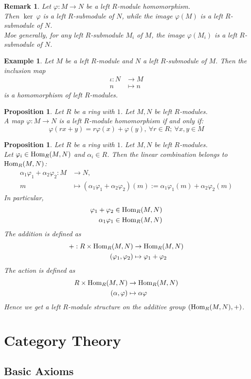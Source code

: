 \documentclass[a4paper,8pt]{article}
\newcommand{\hlt}[1]{\textit{{\color{blue}#1}}}
\newcommand{\homs}[1]{\textnormal{Hom}#1}
\theoremstyle{theorem}
\newtheorem{proposition}[theorem]{Proposition}
\newtheorem{example}[theorem]{Example}
\newtheorem{remark}[theorem]{Remark}
\begin{document}
\begin{remark}
Let $\varphi: M \rightarrow N$ be a left $R$-module homomorphism.\\
Then $\ker \ \varphi$ is a left $R$-submodule of $N$, while the image $\varphi(M)$ is a left $R$-submodule of $N$.\\
Moe generally, for any left $R$-submodule $M_i$ of $M$, the image $\varphi(M_i)$ is a left $R$-submodule of $N$.
\end{remark}

\begin{example}
Let $M$ be a left $R$-module and $N$ a left $R$-submodule of $M$. Then the inclusion map
\begin{align}
\iota: N &\rightarrow M \nonumber \\
n &\mapsto n \nonumber
\end{align}
is a homomorphism of left $R$-modules.
\end{example}

\begin{proposition}
Let $R$ be a ring with $1$. Let $M, N$ be left $R$-modules.\\
A map $\varphi: M \rightarrow N$ is a left $R$-module homomorphism if and only if:
\begin{equation}
\varphi(rx+y) = r\varphi(x) + \varphi(y), \ \forall r \in R; \ \forall x, y \in M \nonumber
\end{equation}
\end{proposition}

\begin{proposition}
Let $R$ be a ring with $1$. Let $M, N$ be left $R$-modules.\\
Let $\varphi_i \in \homs_R(M,N)$ and $\alpha_i \in R$. Then the \hlt{linear combination} belongs to $\homs_R(M,N)$:
\begin{align}
\alpha_1 \varphi_1 + \alpha_2 \varphi_2: M &\rightarrow N, \nonumber \\
m &\mapsto (\alpha_1 \varphi_1 + \alpha_2 \varphi_2)(m) := \alpha_1 \varphi_1(m) + \alpha_2 \varphi_2(m) \nonumber
\end{align}
In particular, 
\begin{align}
\varphi_1 + \varphi_2 &\in \homs_R(M,N) \nonumber \\
\alpha_1 \varphi_1 &\in \homs_R(M,N) \nonumber
\end{align}
The addition is defined as
\begin{align}
+ : R \times \homs_R(M,N) &\rightarrow \homs_R(M,N) \nonumber \\
(\varphi_1, \varphi_2) &\mapsto \varphi_1 + \varphi_2 \nonumber
\end{align}
The action is defined as
\begin{align}
R \times \homs_R(M,N) &\rightarrow \homs_R(M,N) \nonumber \\
(\alpha, \varphi) &\mapsto \alpha \varphi \nonumber
\end{align}
Hence we get a left $R$-module structure on the additive group $(\homs_R(M,N), +)$.
\end{proposition}


\newpage

\section{Category Theory}
\subsection{Basic Axioms}
\end{document}
